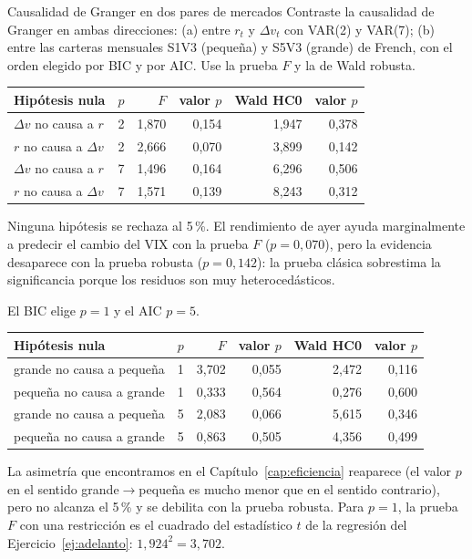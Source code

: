 \begin{ejresuelto}{Causalidad de Granger en dos pares de mercados}\label{ej:granger}
\enunciado Contraste la causalidad de Granger en ambas direcciones: (a) entre $r_t$ y $\Delta v_t$ con VAR(2) y
VAR(7); (b) entre las carteras mensuales S1V3 (pequeña) y S5V3 (grande) de French, con el orden elegido por BIC
y por AIC. Use la prueba $F$ y la de Wald robusta.

\solucion
{}
\begin{center}\small
\begin{tabular}{@{}llrrrr@{}}
\toprule
Hipótesis nula & $p$ & $F$ & valor $p$ & Wald HC0 & valor $p$ \\
\midrule
$\Delta v$ no causa a $r$ & 2 & 1,870 & 0,154 & 1,947 & 0,378 \\
$r$ no causa a $\Delta v$ & 2 & 2,666 & 0,070 & 3,899 & 0,142 \\
$\Delta v$ no causa a $r$ & 7 & 1,496 & 0,164 & 6,296 & 0,506 \\
$r$ no causa a $\Delta v$ & 7 & 1,571 & 0,139 & 8,243 & 0,312 \\
\bottomrule
\end{tabular}
\end{center}
Ninguna hipótesis se rechaza al 5\,\%. El rendimiento de ayer ayuda marginalmente a predecir el cambio del VIX
con la prueba $F$ ($p=0{,}070$), pero la evidencia desaparece con la prueba robusta ($p=0{,}142$): la prueba
clásica sobrestima la significancia porque los residuos son muy heterocedásticos.

 El BIC elige $p=1$ y el AIC $p=5$.
\begin{center}\small
\begin{tabular}{@{}llrrrr@{}}
\toprule
Hipótesis nula & $p$ & $F$ & valor $p$ & Wald HC0 & valor $p$ \\
\midrule
grande no causa a pequeña & 1 & 3,702 & 0,055 & 2,472 & 0,116 \\
pequeña no causa a grande & 1 & 0,333 & 0,564 & 0,276 & 0,600 \\
grande no causa a pequeña & 5 & 2,083 & 0,066 & 5,615 & 0,346 \\
pequeña no causa a grande & 5 & 0,863 & 0,505 & 4,356 & 0,499 \\
\bottomrule
\end{tabular}
\end{center}
La asimetría que encontramos en el Capítulo~\ref{cap:eficiencia} reaparece (el valor $p$ en el sentido
grande$\to$pequeña es mucho menor que en el sentido contrario), pero no alcanza el 5\,\% y se debilita con la
prueba robusta. Para $p=1$, la prueba $F$ con una restricción es el cuadrado del estadístico $t$ de la
regresión del Ejercicio~\ref{ej:adelanto}: $1{,}924^2=3{,}702$.


\end{ejresuelto}
